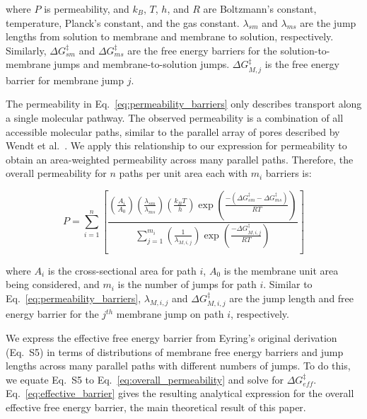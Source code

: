 \documentclass[12pt]{article}
\begin{document}
\noindent where $P$ is permeability, and $k_B$, $T$, $h$, and $R$ are Boltzmann's constant, temperature, Planck's constant, and the gas constant. $\lambda_{sm}$ and $\lambda_{ms}$ are the jump lengths from solution to membrane and membrane to solution, respectively. Similarly, $\Delta G_{sm}^{\ddagger}$ and $\Delta G_{ms}^{\ddagger}$ are the free energy barriers for the solution-to-membrane jumps and membrane-to-solution jumps. $\Delta G_{M,j}^{\ddagger}$ is the free energy barrier for membrane jump $j$.

The permeability in Eq.~\ref{eq:permeability_barriers} only describes transport along a single molecular pathway. The observed permeability is a combination of all accessible molecular paths, similar to the parallel array of pores described by Wendt et al.~\cite{wendt_effect_1976}. We apply this relationship to our expression for permeability to obtain an area-weighted permeability across many parallel paths. Therefore, the overall permeability for $n$ paths per unit area each with $m_i$ barriers is: 

\begin{equation}
    P = \sum_{i=1}^{n} \left[ \frac{\displaystyle \left( \frac{A_i}{A_0} \right) \left( \frac{\lambda_{sm}}{\lambda_{ms}} \right) \left( \frac{k_B T}{h} \right) \exp{\left( \frac{ -\left( \Delta G_{sm}^{\ddagger} - \Delta G_{ms}^{\ddagger} \right)}{R T} \right)}}{\displaystyle \sum_{j=1}^{m_i} \left( \frac{1}{\lambda_{M,i,j}} \right) \exp{\left( \frac{-\Delta G_{M,i,j}^{\ddagger}}{R T} \right) }} \right]
    \label{eq:overall_permeability}
\end{equation}

where \noindent $A_i$ is the cross-sectional area for path $i$, $A_0$ is the membrane unit area being considered, and $m_i$ is the number of jumps for path $i$. Similar to Eq.~\ref{eq:permeability_barriers}, $\lambda_{M,i,j}$ and $\Delta G_{M,i,j}^{\ddagger}$ are the jump length and free energy barrier for the $j^{th}$ membrane jump on path $i$, respectively.

We express the effective free energy barrier from Eyring's original derivation (Eq.~S5) in terms of distributions of membrane free energy barriers and jump lengths across many parallel paths with different numbers of jumps. To do this, we equate Eq.~S5 to Eq.~\ref{eq:overall_permeability} and solve for $\Delta G_{eff}^{\ddagger}$. Eq.~\ref{eq:effective_barrier} gives the resulting analytical expression for the overall effective free energy barrier, the main theoretical result of this paper.
\end{document}

